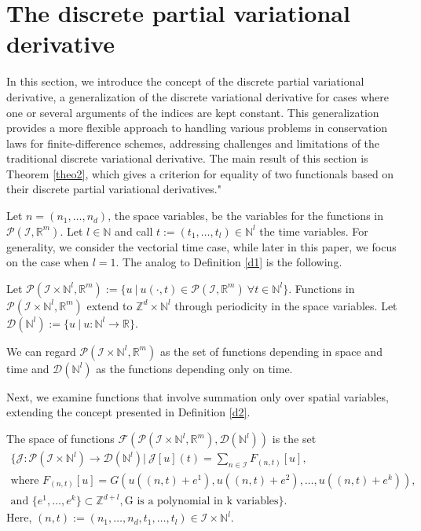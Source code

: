 \documentclass[runningheads]{llncs}
\newcommand{\Rr}{\mathbb{R}}
\newcommand{\Nn}{\mathbb{N}}
\newcommand{\Zz}{{\mathbb{Z}}}
\newcommand{\1}{\chi}
\newcommand{\Ii}{\mathcal{I}}
\begin{document}
\section{The discrete partial variational derivative}
\label{pvard}

In this section, we introduce the concept of the discrete partial variational derivative, a generalization of the discrete variational derivative for cases where one or several arguments of the indices are kept constant. This generalization provides a more flexible approach to handling various problems in conservation laws for finite-difference schemes, addressing challenges and limitations of the traditional discrete variational derivative. The main result of this section is Theorem \ref{theo2}, which gives a criterion for equality of two functionals based on their discrete partial variational derivatives."

Let $n=(n_1,\ldots,n_d)$, the space variables, be the variables for the functions in $\mathcal{P}(\Ii,\Rr^m)$. Let $l\in\Nn$ and call $t:=(t_1,\ldots,t_l)\in\Nn^l$ the time variables. For generality, we consider the vectorial time case, while later in this paper, we focus on the case when $l=1$.
The analog to Definition \ref{d1} is the following. 
\begin{definition}
	Let $\mathcal{P}(\Ii\times\Nn^l,\Rr^m):=\{u\ |\ u(\cdot,t)\in\mathcal{P}(\Ii,\Rr^m)\ \forall t\in\Nn^l \}$.
	Functions in $\mathcal{P}(\Ii\times\Nn^l,\Rr^m)$ extend to $\Zz^d\times\Nn^l$ through  periodicity in the space variables.
	Let $\mathcal{D}(\Nn^l):=\{u\ |\ u:\Nn^l\rightarrow\Rr\}$.
\end{definition}
We can regard $\mathcal{P}(\Ii\times\Nn^l,\Rr^m)$ as the set of functions depending in space and time and $\mathcal{D}(\Nn^l)$ as the functions depending only on time. 

Next, we examine functions that involve summation only over spatial variables, extending the concept presented in Definition \ref{d2}.
\begin{definition}
	\label{quantityfunc2}
	The space of functions $\mathcal{F}(\mathcal{P}(\Ii\times\Nn^l,\Rr^m),\mathcal{D}(\Nn^l))$ is the set
	\begin{gather*}
		\Bigg\{\mathcal{J}:\mathcal{P}(\Ii\times\Nn^l)\rightarrow\mathcal{D}(\Nn^l) \Bigg|\ \mathcal{J}[u](t)=\sum_{n\in\Ii}F_{(n,t)}[u],\\
		\text{where } F_{(n,t)}[u]=G(u((n,t)+e^1),u((n,t)+e^2),\ldots,u((n,t)+e^k)),\\
		\text{and }
		\{e^1,\ldots,e^k\}\subset\Zz^{d+l},\text{G is a polynomial in k variables}\Bigg\}.
	\end{gather*}
	Here, $(n,t):=(n_1,\ldots,n_d,t_1,\ldots,t_l)\in\Ii\times\Nn^l$.
\end{definition}
\end{document}
